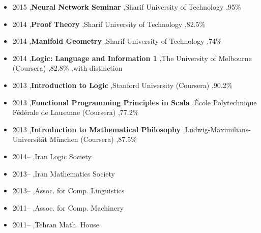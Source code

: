 
\begin{itemize}
\item 2015 \sep \textbf{Neural Network Seminar} \sep Sharif University of Technology \sep 95\%
\item 2014 \sep \textbf{Proof Theory} \sep Sharif University of Technology \sep 82.5\%
\item 2014 \sep \textbf{Manifold Geometry} \sep Sharif University of Technology \sep 74\%
\item 2014 \sep \textbf{Logic: Language and Information 1} \sep The University of Melbourne (Coursera) \sep 82.8\%
\sep with distinction
\item 2013 \sep \textbf{Introduction to Logic} \sep Stanford University (Coursera) \sep 90.2\%
\item 2013 \sep \textbf{Functional Programming Principles in Scala} \sep \'Ecole Polytechnique F\'ed\'erale de Lausanne (Coursera) \sep 77.2\%
\item 2013 \sep \textbf{Introduction to Mathematical Philosophy} \sep Ludwig-Maximilians- Universität München (Coursera) \sep 87.5\%
\end{itemize}



\begin{itemize}
\item 2014-- \sep Iran Logic Society
\item 2013-- \sep Iran Mathematics Society
\item 2013-- \sep Assoc. for Comp. Linguistics
\item 2011-- \sep Assoc. for Comp. Machinery
\item 2011-- \sep Tehran Math. House
\end{itemize}

\label{skills}

